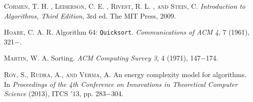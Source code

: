 \documentclass[a4paper, 10pt,twocolumn]{article}
\begin{document}
\begin{thebibliography}{25}
\textsc{Cormen, T. H. , Leiserson, C. E. , Rivest, R. L. , and
Stein, C}. \textit{Introduction to Algorithms, Third Edition},
3rd ed. The MIT Press, 2009.

\textsc{Hoare, C. A. R}. Algorithm 64: \texttt{Quicksort}. \textit{Communications
of ACM 4}, 7 (1961), 321$-$.

\textsc{Martin, W. A}. Sorting. \textit{ACM Computing Survey 3},
4 (1971), 147$-$174.

\textsc{Roy, S., Rudra, A., and Verma, A}. An energy
complexity model for algorithms. In \textit{Proceedings
of the 4th Conference on Innovations in
Theoretical Computer Science} (2013), ITCS
$'13$, pp. 283$-$304.

\end{thebibliography}
\end{document}
